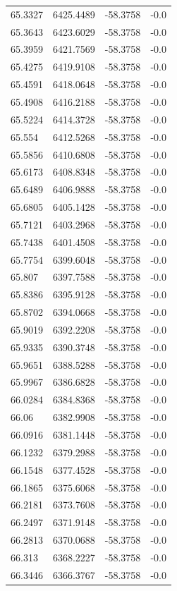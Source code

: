 \begin{table}[H]
\begin{tabular}{llll}
65.3327 & 6425.4489 & -58.3758 & -0.0 \\
65.3643 & 6423.6029 & -58.3758 & -0.0 \\
65.3959 & 6421.7569 & -58.3758 & -0.0 \\
65.4275 & 6419.9108 & -58.3758 & -0.0 \\
65.4591 & 6418.0648 & -58.3758 & -0.0 \\
65.4908 & 6416.2188 & -58.3758 & -0.0 \\
65.5224 & 6414.3728 & -58.3758 & -0.0 \\
65.554 & 6412.5268 & -58.3758 & -0.0 \\
65.5856 & 6410.6808 & -58.3758 & -0.0 \\
65.6173 & 6408.8348 & -58.3758 & -0.0 \\
65.6489 & 6406.9888 & -58.3758 & -0.0 \\
65.6805 & 6405.1428 & -58.3758 & -0.0 \\
65.7121 & 6403.2968 & -58.3758 & -0.0 \\
65.7438 & 6401.4508 & -58.3758 & -0.0 \\
65.7754 & 6399.6048 & -58.3758 & -0.0 \\
65.807 & 6397.7588 & -58.3758 & -0.0 \\
65.8386 & 6395.9128 & -58.3758 & -0.0 \\
65.8702 & 6394.0668 & -58.3758 & -0.0 \\
65.9019 & 6392.2208 & -58.3758 & -0.0 \\
65.9335 & 6390.3748 & -58.3758 & -0.0 \\
65.9651 & 6388.5288 & -58.3758 & -0.0 \\
65.9967 & 6386.6828 & -58.3758 & -0.0 \\
66.0284 & 6384.8368 & -58.3758 & -0.0 \\
66.06 & 6382.9908 & -58.3758 & -0.0 \\
66.0916 & 6381.1448 & -58.3758 & -0.0 \\
66.1232 & 6379.2988 & -58.3758 & -0.0 \\
66.1548 & 6377.4528 & -58.3758 & -0.0 \\
66.1865 & 6375.6068 & -58.3758 & -0.0 \\
66.2181 & 6373.7608 & -58.3758 & -0.0 \\
66.2497 & 6371.9148 & -58.3758 & -0.0 \\
66.2813 & 6370.0688 & -58.3758 & -0.0 \\
66.313 & 6368.2227 & -58.3758 & -0.0 \\
66.3446 & 6366.3767 & -58.3758 & -0.0 \\

\end{tabular}
\end{table}

